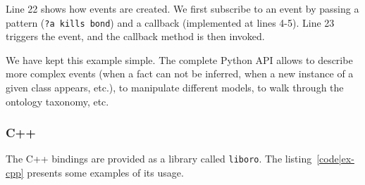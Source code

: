 Line 22 shows how events are created. We first subscribe to an event by passing
a pattern ({\tt ?a kills bond}) and a callback (implemented at lines 4-5).
Line 23 triggers the event, and the callback method is then invoked.

We have kept this example simple. The complete Python API allows to describe
more complex events (when a fact can not be inferred, when a new instance of a
given class appears, etc.), to manipulate different models, to walk through the
ontology taxonomy, etc.

\subsubsection{C++}

The C++ bindings are provided as a library called {\tt liboro}. The
listing~\ref{code|ex-cpp} presents some examples of its usage.

